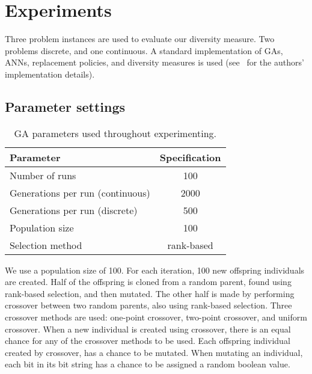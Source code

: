 \section{Experiments}
Three problem instances are used to evaluate our diversity measure. Two problems discrete, and one continuous. A standard implementation of GAs, ANNs, replacement policies, and diversity measures is used (see~\cite{mbm:kmc:ekoGA} for the authors' implementation details). 

\subsection{Parameter settings}

\begin{table}
  \centering
  \begin{tabular}{l S}
    \toprule
    Parameter & {Specification} \\
    \midrule
    Number of runs & 100 \\
    Generations per run (continuous) & 2000 \\
    Generations per run (discrete) & 500 \\
    Population size & 100 \\
    Selection method & {rank-based} \\
    \bottomrule
  \end{tabular}
  \caption{GA parameters used throughout experimenting.}
  \label{tab:gaparam}
\end{table}

We use a population size of 100. For each iteration, 100 new offspring individuals are created. Half of the offspring is cloned from a random parent, found using rank-based selection, and then mutated. The other half is made by performing crossover between two random parents, also using rank-based selection.
Three crossover methods are used: one-point crossover, two-point crossover, and uniform crossover. When a new individual is created using crossover, there is an equal chance for any of the crossover methods to be used. 
Each offspring individual created by crossover, has a  chance to be mutated.
When mutating an individual, each bit in its bit string has a  chance to be assigned a random boolean value.





